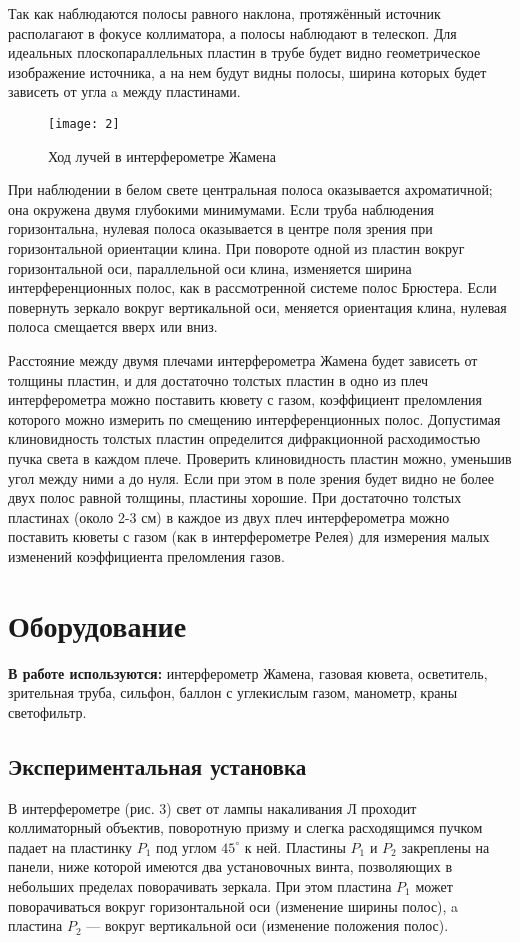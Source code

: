 \documentclass[a4paper, 12pt]{article}
\begin{document}
Так как наблюдаются полосы равного наклона, протяжённый источник
располагают в фокусе коллиматора, а полосы наблюдают в телескоп. Для
идеальных плоскопараллельных пластин в трубе будет видно
геометрическое изображение источника, а на нем будут видны полосы,
ширина которых будет зависеть от угла a между пластинами.

\begin{figure}[H]
    \texttt{[image: 2]} 
    \captionsetup{justification=centering}
    \caption{Ход лучей в интерферометре Жамена}
\end{figure}

При наблюдении в белом свете центральная полоса оказывается
ахроматичной; она окружена двумя глубокими минимумами. Если труба
наблюдения горизонтальна, нулевая полоса оказывается в центре поля
зрения при горизонтальной ориентации клина. При повороте одной из
пластин вокруг горизонтальной оси, параллельной оси клина, изменяется
ширина интерференционных полос, как в рассмотренной системе полос
Брюстера. Если повернуть зеркало вокруг вертикальной оси, меняется
ориентация клина, нулевая полоса смещается вверх или вниз.

Расстояние между двумя плечами интерферометра Жамена будет зависеть от
толщины пластин, и для достаточно толстых пластин в одно из плеч
интерферометра можно поставить кювету с газом, коэффициент преломления
которого можно измерить по смещению интерференционных полос.
Допустимая клиновидность толстых пластин определится дифракционной
расходимостью пучка света в каждом плече. Проверить клиновидность
пластин можно, уменьшив угол между ними а до нуля. Если при этом в
поле зрения будет видно не более двух полос равной толщины, пластины
хорошие. При достаточно толстых пластинах (около 2-3 см) в каждое из
двух плеч интерферометра можно поставить кюветы с газом (как в
интерферометре Релея) для измерения малых изменений коэффициента
преломления газов.



\section{Оборудование}
\textbf{В работе используются:} интерферометр Жамена, газовая кювета,
осветитель, зрительная труба, сильфон, баллон с углекислым газом,
манометр, краны светофильтр.

\subsection*{Экспериментальная установка}
В интерферометре (рис. 3) свет от лампы накаливания Л проходит
коллиматорный объектив, поворотную призму и слегка расходящимся пучком
падает на пластинку $P_1$ под углом $45^\circ$ к ней. Пластины $P_1$ и
$P_2$
закреплены на панели, ниже которой имеются два установочных винта,
позволяющих в небольших пределах поворачивать зеркала. При этом
пластина $P_1$ может поворачиваться вокруг горизонтальной оси (изменение
ширины полос), a пластина $P_2$ — вокруг вертикальной оси (изменение
положения полос).
\end{document}
